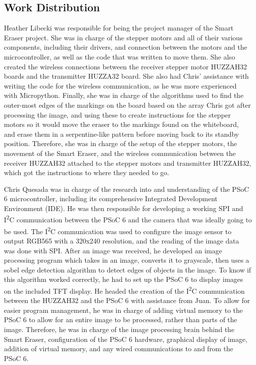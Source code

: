 \subsection{Work Distribution}
\setlength{\parindent}{2.5ex} Heather Libecki was responsible for being the project manager of the Smart Eraser project. She was in charge of the stepper motors and all of their various components, including their drivers, and connection between the motors and the microcontroller, as well as the code that was written to move them. She also created the wireless connections between the receiver stepper motor HUZZAH32 boards and the transmitter HUZZA32 board. She also had Chris' assistance with writing the code for the wireless communication, as he was more experienced with Micropython. Finally, she was in charge of the algorithms used to find the outer-most edges of the markings on the board based on the array Chris got after processing the image, and using these to create instructions for the stepper motors so it would move the eraser to the markings found on the whiteboard, and erase them in a serpentine-like pattern before moving back to its standby position. Therefore, she was in charge of the setup of the stepper motors, the movement of the Smart Eraser, and the wireless communication between the receiver HUZZAH32 attached to the stepper motors and transmitter HUZZAH32, which got the instructions to where they needed to go. \par
\setlength{\parindent}{2.5ex} Chris Quesada was in charge of the research into and understanding of the PSoC 6 microcontroller, including its comprehensive Integrated Development Environment (IDE). He was then responsible for developing a working SPI and I\textsuperscript{2}C communication between the PSoC 6 and the camera that was ideally going to be used. The I\textsuperscript{2}C communication was used to configure the image sensor to output RGB565 with a 320x240 resolution, and the reading of the image data was done with SPI. After an image was received, he developed an image processing program which takes in an image, converts it to grayscale, then uses a sobel edge detection algorithm to detect edges of objects in the image. To know if this algorithm worked correctly, he had to set up the PSoC 6 to display images on the included TFT display. He headed the creation of the I\textsuperscript{2}C communication between the HUZZAH32 and the PSoC 6 with assistance from Juan. To allow for easier program management, he was in charge of adding virtual memory to the PSoC 6 to allow for an entire image to be processed, rather than parts of the image. Therefore, he was in charge of the image processing brain behind the Smart Eraser, configuration of the PSoC 6 hardware, graphical display of image, addition of virtual memory, and any wired communications to and from the PSoC 6.
